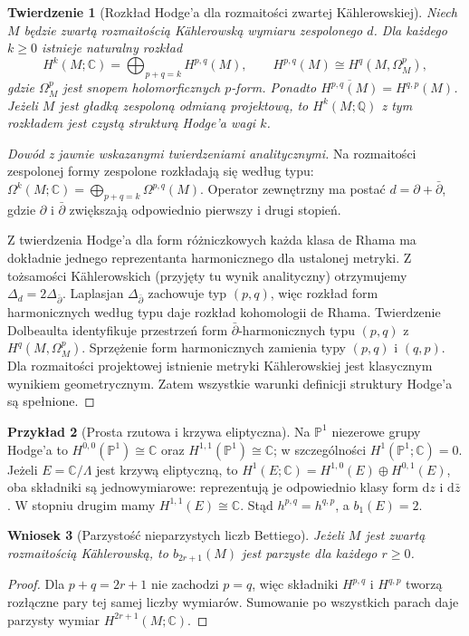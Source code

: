 \documentclass[11pt,a4paper,oneside]{report}
\newcommand{\C}{\mathbb{C}}
\newcommand{\Q}{\mathbb{Q}}
\newcommand{\dd}{\mathrm d}
\theoremstyle{plain}
\newtheorem{twierdzenie}{Twierdzenie}[section]
\newtheorem{wniosek}[twierdzenie]{Wniosek}
\theoremstyle{definition}
\newtheorem{przyklad}[twierdzenie]{Przykład}
\theoremstyle{remark}
\begin{document}
\begin{twierdzenie}[Rozkład Hodge'a dla rozmaitości zwartej Kählerowskiej]
\label{thm:kahler-hodge-xiv}
Niech $M$ będzie zwartą rozmaitością Kählerowską
wymiaru zespolonego $d$. Dla każdego $k\ge0$
istnieje naturalny rozkład
\[
H^k(M;\C)=\bigoplus_{p+q=k}H^{p,q}(M),
\qquad H^{p,q}(M)\cong H^q(M,\Omega_M^p),
\]
gdzie $\Omega_M^p$ jest snopem holomorficznych $p$-form.
Ponadto $\overline{H^{p,q}(M)}=H^{q,p}(M)$.
Jeżeli $M$ jest gładką zespoloną odmianą projektową,
to $H^k(M;\Q)$ z tym rozkładem jest czystą
strukturą Hodge'a wagi $k$.
\end{twierdzenie}
\begin{proof}[Dowód z jawnie wskazanymi twierdzeniami analitycznymi]
Na rozmaitości zespolonej formy zespolone rozkładają
się według typu: $\Omega^k(M;\C)=
\bigoplus_{p+q=k}\Omega^{p,q}(M)$.
Operator zewnętrzny ma postać
$d=\partial+\bar\partial$,
gdzie $\partial$ i $\bar\partial$ zwiększają
odpowiednio pierwszy i drugi stopień.

Z twierdzenia Hodge'a dla form różniczkowych
każda klasa de Rhama ma dokładnie jednego
reprezentanta harmonicznego dla ustalonej metryki.
Z tożsamości Kählerowskich (przyjęty tu wynik
analityczny) otrzymujemy
$\Delta_d=2\Delta_{\bar\partial}$.
Laplasjan $\Delta_{\bar\partial}$ zachowuje typ
$(p,q)$, więc rozkład form harmonicznych według
typu daje rozkład kohomologii de Rhama.
Twierdzenie Dolbeaulta identyfikuje przestrzeń
form $\bar\partial$-harmonicznych typu $(p,q)$
z $H^q(M,\Omega_M^p)$.
Sprzężenie form harmonicznych zamienia typy
$(p,q)$ i $(q,p)$. Dla rozmaitości projektowej
istnienie metryki Kählerowskiej jest klasycznym
wynikiem geometrycznym. Zatem wszystkie warunki
definicji struktury Hodge'a są spełnione.
\end{proof}

\begin{przyklad}[Prosta rzutowa i krzywa eliptyczna]
Na $\mathbb P^1$ niezerowe grupy Hodge'a to
$H^{0,0}(\mathbb P^1)\cong\C$ oraz
$H^{1,1}(\mathbb P^1)\cong\C$; w szczególności
$H^1(\mathbb P^1;\C)=0$.
Jeżeli $E=\C/\Lambda$ jest krzywą eliptyczną,
to $H^1(E;\C)=H^{1,0}(E)\oplus H^{0,1}(E)$,
oba składniki są jednowymiarowe: reprezentują je
odpowiednio klasy form $\dd z$ i $\dd\bar z$.
W stopniu drugim mamy $H^{1,1}(E)\cong\C$.
Stąd $h^{p,q}=h^{q,p}$, a $b_1(E)=2$.
\end{przyklad}

\begin{wniosek}[Parzystość nieparzystych liczb Bettiego]
Jeżeli $M$ jest zwartą rozmaitością Kählerowską,
to $b_{2r+1}(M)$ jest parzyste dla każdego $r\ge0$.
\end{wniosek}
\begin{proof}
Dla $p+q=2r+1$ nie zachodzi $p=q$, więc
składniki $H^{p,q}$ i $H^{q,p}$ tworzą rozłączne
pary tej samej liczby wymiarów. Sumowanie po
wszystkich parach daje parzysty wymiar $H^{2r+1}(M;\C)$.
\end{proof}
\end{document}
